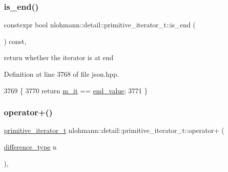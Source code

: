 \subsubsection{\texorpdfstring{is\+\_\+end()}{is\_end()}}
{\footnotesize\ttfamily constexpr bool nlohmann\+::detail\+::primitive\+\_\+iterator\+\_\+t\+::is\+\_\+end (\begin{DoxyParamCaption}{ }\end{DoxyParamCaption}) const\hspace{0.3cm}{\ttfamily [inline]}, {\ttfamily [noexcept]}}



return whether the iterator is at end 



Definition at line 3768 of file json.\+hpp.


\begin{DoxyCode}
3769     \{
3770         \textcolor{keywordflow}{return} \hyperlink{classnlohmann_1_1detail_1_1primitive__iterator__t_a4357355113b0cd7e12b15c2e93703510}{m\_it} == \hyperlink{classnlohmann_1_1detail_1_1primitive__iterator__t_aa37c37da44f19e6ec1d7d4a9910511c7}{end\_value};
3771     \}
\end{DoxyCode}
\mbox{\label{classnlohmann_1_1detail_1_1primitive__iterator__t_a00ce828d0fe58046c10e0445504df7bf}} 
\subsubsection{\texorpdfstring{operator+()}{operator+()}}
{\footnotesize\ttfamily \hyperlink{classnlohmann_1_1detail_1_1primitive__iterator__t}{primitive\+\_\+iterator\+\_\+t} nlohmann\+::detail\+::primitive\+\_\+iterator\+\_\+t\+::operator+ (\begin{DoxyParamCaption}\item[{\hyperlink{classnlohmann_1_1detail_1_1primitive__iterator__t_af3db0d5c90de427d51645fe73a015553}{difference\+\_\+type}}]{n }\end{DoxyParamCaption})\hspace{0.3cm}{\ttfamily [inline]}, {\ttfamily [noexcept]}}



